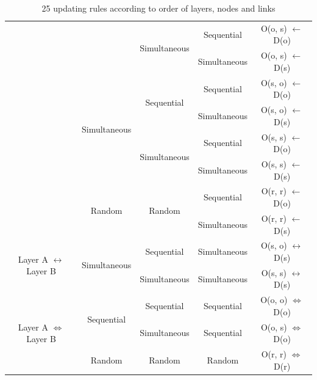 \documentclass[review]{elsarticle}
\begin{document}
\begin{table}[htp]
\begin{center}
\begin{tabular}{c|c|c|c|c}
			&                                & \multirow{2}{*}{Simultaneous}      & Sequential             & O(o, s) $\leftarrow$ D(o) \\  \cline{4-5} 
			&                                &                                    & Simultaneous           & O(o, s) $\leftarrow$ D(s) \\  \cline{2-5} 
			& \multirow{4}{*}{Simultaneous}  & \multirow{2}{*}{Sequential}        & Sequential             & O(s, o) $\leftarrow$ D(o) \\  \cline{4-5}
			&                                &                                    & Simultaneous           & O(s, o) $\leftarrow$ D(s) \\  \cline{3-5}
			&                                & \multirow{2}{*}{Simultaneous}      & Sequential             & O(s, s) $\leftarrow$ D(o) \\  \cline{4-5}
			&                                &                                    & Simultaneous           & O(s, s) $\leftarrow$ D(s) \\  \cline{2-5}
			& \multirow{2}{*}{Random}        & \multirow{2}{*}{Random}            & Sequential             & O(r, r) $\leftarrow$ D(o) \\  \cline{4-5}
			&                                &                                    & Simultaneous           & O(r, r) $\leftarrow$ D(s) \\   \hline
			\multirow{2}{*}{Layer A $\leftrightarrow$ Layer B}& \multirow{2}{*}{Simultaneous}& Sequential                         & Simultaneous           & O(s, o) $\leftrightarrow$ D(s) \\ \cline{3-5}
			&                                & Simultaneous                       & Simultaneous           & O(s, s) $\leftrightarrow$ D(s) \\ \hline
			\multirow{3}{*}{Layer A $\Leftrightarrow$ Layer B}& \multirow{2}{*}{Sequential}  & Sequential                         & Sequential             & O(o, o) $\Leftrightarrow$ D(o) \\ \cline{3-5}
			&                                & Simultaneous                       & Sequential             & O(o, s) $\Leftrightarrow$ D(o) \\ \cline{2-5}
			& Random                         & Random                             & Random                 & O(r, r) $\Leftrightarrow$ D(r) \\ \hline
			
		\end{tabular}
	\end{center}
	\caption{25 updating rules according to order of layers, nodes and links}
	\label{table1}
\end{table}
\end{document}
